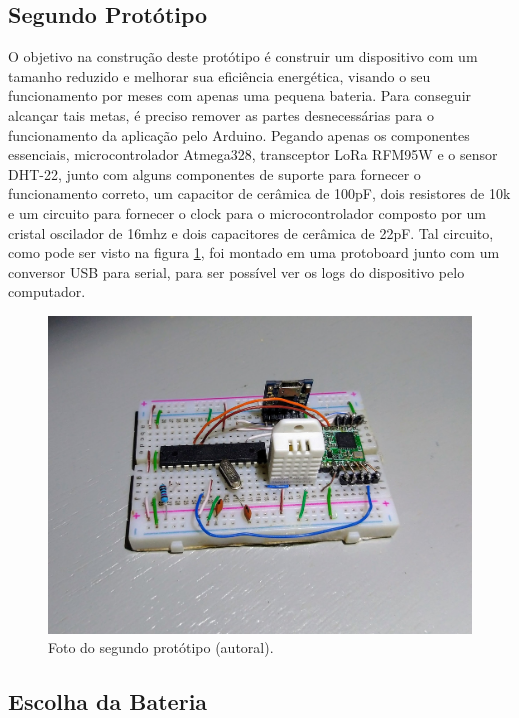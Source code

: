 \subsection{Segundo Protótipo}
\label{metod:end-node:2-proto}
O objetivo na construção deste protótipo é construir um dispositivo com um tamanho reduzido e melhorar sua eficiência energética, visando o seu funcionamento por meses com apenas uma pequena bateria. Para conseguir alcançar tais metas, é preciso remover as partes desnecessárias para o funcionamento da aplicação pelo Arduino. Pegando apenas os componentes essenciais, microcontrolador Atmega328, transceptor LoRa RFM95W e o sensor DHT-22, junto com alguns componentes de suporte para fornecer o funcionamento correto, um capacitor de cerâmica de 100pF, dois resistores de 10k  e um circuito para fornecer o clock para o microcontrolador composto por um cristal oscilador de 16mhz e dois capacitores de cerâmica de 22pF. Tal circuito, como pode ser visto na figura \ref{fig:end-node-proto-2}, foi montado em uma protoboard junto com um conversor USB para serial, para ser possível ver os logs do dispositivo pelo computador.

\begin{figure}[H]
  \centering
  \includegraphics[width=.80\textwidth]{assets/end-node-proto-2.png} 
  \caption{Foto do segundo protótipo (autoral).}
  \label{fig:end-node-proto-2} 
\end{figure}

\subsection{Escolha da Bateria}
\label{metod:end-node:bateria}


